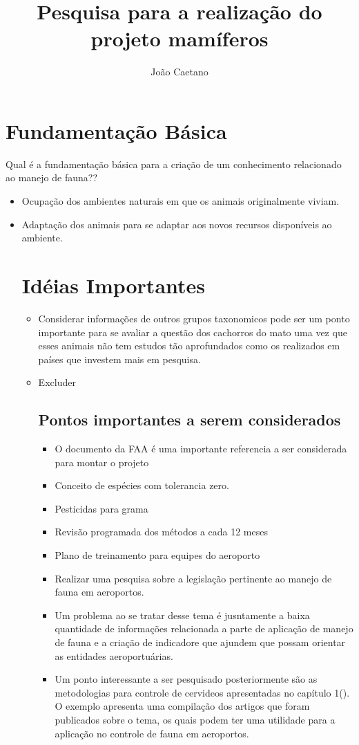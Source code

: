 \documentclass[a4paper,16,onecolumn]{article}
\author{João Caetano}
\title{Pesquisa para a realização do projeto mamíferos}
\begin{document}
\maketitle
\tableofcontents
\pagebreak
\section{Fundamentação Básica}
Qual é a fundamentação básica para a criação de um conhecimento relacionado ao manejo de fauna??
\begin{itemize}
\item Ocupação dos ambientes naturais em que os animais originalmente viviam.
\item Adaptação dos animais para se adaptar aos novos recursos disponíveis ao ambiente.
\section{Idéias Importantes}
\begin{itemize}
\item Considerar informações de outros grupos taxonomicos pode ser um ponto importante para se avaliar a questão dos cachorros do mato uma vez que esses animais não tem estudos tão aprofundados como os realizados em países que investem mais em pesquisa.
\item Excluder

\subsection{Pontos importantes a serem considerados}
\begin{itemize}
\item O documento da FAA é uma importante referencia a ser considerada para montar o projeto
\item Conceito de espécies com tolerancia zero.
\item Pesticidas para grama
\item Revisão programada dos métodos a cada 12 meses 
\item Plano de treinamento para equipes do aeroporto
\item Realizar uma pesquisa sobre a legislação pertinente ao manejo de fauna em aeroportos.
\item Um problema ao se tratar desse tema é jusntamente a baixa quantidade de informações relacionada a parte de aplicação de manejo de fauna e a criação de indicadore que ajundem que possam orientar as entidades aeroportuárias.
\item Um ponto interessante a ser pesquisado posteriormente são as metodologias para controle de cervideos apresentadas no capítulo 1(\cite{Adams2016}). O exemplo apresenta uma compilação dos artigos que foram publicados sobre o tema, os quais podem ter uma utilidade para a aplicação no controle de fauna em aeroportos.


\end{itemize}
\end{itemize}
\end{itemize}
\end{document}
